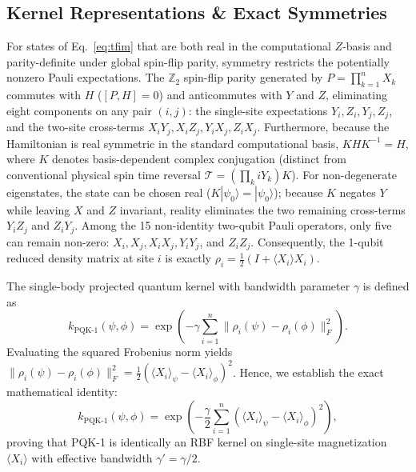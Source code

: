 \documentclass[conference]{IEEEtran}
\begin{document}
\subsection{Kernel Representations \& Exact Symmetries}
For states of Eq.~\eqref{eq:tfim} that are both real in the computational $Z$-basis and parity-definite under global spin-flip parity, symmetry restricts the potentially nonzero Pauli expectations. The $\mathbb{Z}_2$ spin-flip parity generated by $P = \prod_{k=1}^n X_k$ commutes with $H$ ($[P, H] = 0$) and anticommutes with $Y$ and $Z$, eliminating eight components on any pair $(i, j)$: the single-site expectations $Y_i, Z_i, Y_j, Z_j$, and the two-site cross-terms $X_i Y_j, X_i Z_j, Y_i X_j, Z_i X_j$. Furthermore, because the Hamiltonian is real symmetric in the standard computational basis, $K H K^{-1} = H$, where $K$ denotes basis-dependent complex conjugation (distinct from conventional physical spin time reversal $\mathcal{T} = (\prod_k i Y_k) K$). For non-degenerate eigenstates, the state can be chosen real ($K |\psi_0\rangle = |\psi_0\rangle$); because $K$ negates $Y$ while leaving $X$ and $Z$ invariant, reality eliminates the two remaining cross-terms $Y_i Z_j$ and $Z_i Y_j$. Among the 15 non-identity two-qubit Pauli operators, only five can remain non-zero: $X_i, X_j, X_i X_j, Y_i Y_j$, and $Z_i Z_j$. Consequently, the 1-qubit reduced density matrix at site $i$ is exactly $\rho_i = \frac{1}{2}(I + \langle X_i \rangle X_i)$.

The single-body projected quantum kernel with bandwidth parameter $\gamma$ is defined as
\begin{equation}
k_{\text{PQK-1}}(\psi, \phi) = \exp\left( -\gamma \sum_{i=1}^n \|\rho_i(\psi) - \rho_i(\phi)\|_F^2 \right).
\end{equation}
Evaluating the squared Frobenius norm yields $\|\rho_i(\psi) - \rho_i(\phi)\|_F^2 = \frac{1}{2}(\langle X_i \rangle_\psi - \langle X_i \rangle_\phi)^2$. Hence, we establish the exact mathematical identity:
\begin{equation}
k_{\text{PQK-1}}(\psi, \phi) = \exp\left( -\frac{\gamma}{2} \sum_{i=1}^n (\langle X_i \rangle_\psi - \langle X_i \rangle_\phi)^2 \right),
\end{equation}
proving that PQK-1 is identically an RBF kernel on single-site magnetization $\langle X_i \rangle$ with effective bandwidth $\gamma' = \gamma/2$.
\end{document}
